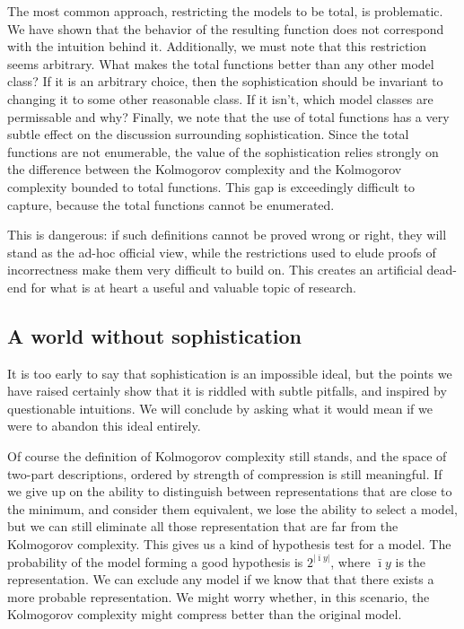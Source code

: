\documentclass{style/llncs}
\begin{document}
The most common approach, restricting the models to be total, is problematic. We have shown that the behavior of the resulting function does not correspond with the intuition behind it. Additionally, we must note that this restriction seems arbitrary. What makes the total functions better than any other model class? If it is an arbitrary choice, then the sophistication should be invariant to changing it to some other reasonable class. If it isn't, which model classes are permissable and why? Finally, we note that the use of total functions has a very subtle effect on the discussion surrounding sophistication. Since the total functions are not enumerable, the value of the sophistication relies strongly on the difference between the Kolmogorov complexity and the Kolmogorov complexity bounded to total functions. This gap is exceedingly difficult to capture, because the total functions cannot be enumerated. 

This is dangerous: if such definitions cannot be proved wrong or right, they will stand as the ad-hoc official view, while the restrictions used to elude proofs of incorrectness make them very difficult to build on. This creates an artificial dead-end for what is at heart a useful and valuable topic of research.

\subsection{A world without sophistication}

It is too early to say that sophistication is an impossible ideal, but the points we have raised certainly show that it is riddled with subtle pitfalls, and inspired by questionable intuitions. We will conclude by asking what it would mean if we were to abandon this ideal entirely.

Of course the definition of Kolmogorov complexity still stands, and the space of two-part descriptions, ordered by strength of compression is still meaningful. If we give up on the ability to distinguish between representations that are close to the minimum, and consider them equivalent, we lose the ability to select a model, but we can still eliminate all those representation that are far from the Kolmogorov complexity. This gives us a kind of hypothesis test for a model. The probability of the model forming a good hypothesis is $2^|\bar\imath y|$, where $\bar\imath y$ is the representation. We can exclude any model if we know that that there exists a more probable representation. We might worry whether, in this scenario, the Kolmogorov complexity might compress better than the original model. 
\end{document}
